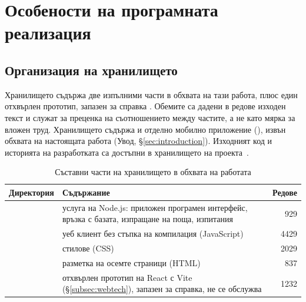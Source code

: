 %
\section{Особености на програмната реализация}
\label{sec:implementation}

\subsection{Организация на хранилището}
\label{subsec:repo}

Хранилището съдържа две изпълними части в обхвата на тази работа, плюс един
отхвърлен прототип, запазен за справка . Обемите са дадени в редове
изходен текст и служат за преценка на съотношението между частите, а не като мярка за
вложен труд. Хранилището съдържа и отделно мобилно приложение (), извън
обхвата на настоящата работа (Увод, §\ref{sec:introduction}). Изходният код и
историята на разработката са достъпни в хранилището на проекта~\cite{walltopia_repository}.

\begin{table}[htbp]
\centering
\caption{Съставни части на хранилището в обхвата на работата}
\label{tab:repo}
{\fontsize{10}{12}\selectfont
\begin{tabular}{@{}L{2.3cm}L{7.6cm}r@{}}
\toprule
\textbf{Директория} & \textbf{Съдържание} & \textbf{Редове} \\
\midrule
{} & услуга на Node.js: приложен програмен интерфейс, връзка с базата, изпращане на поща, изпитания & 929 \\
 & уеб клиент без стъпка на компилация (JavaScript) & 4429 \\
 & стилове (CSS) & 2029 \\
 & разметка на осемте страници (HTML) & 837 \\
 & отхвърлен прототип на React с Vite (§\ref{subsec:webtech}), запазен за справка, не се обслужва & 1232 \\
\bottomrule
\end{tabular}}
\end{table}

